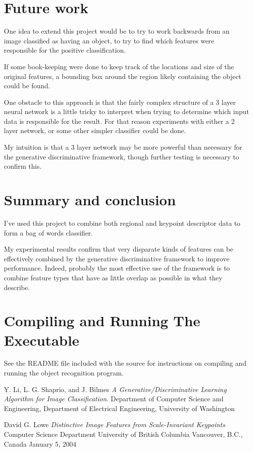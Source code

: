 \documentclass[11pt]{article}
\begin{document}
\section{Future work}

One idea to extend this project would be to try to work backwards from an
image classified as having an object, to try to find which features
were responsible for the positive classification.

If some book-keeping were done to keep track of the locations and size
of the original features, a bounding box around the region likely
containing the object could be found.

One obstacle to this approach is that the fairly complex structure of
a 3 layer neural network is a little tricky to interpret when trying
to determine which input data is responsible for the result. For
that reason experiments with either a 2 layer network, or some other
simpler classifier could be done.

My intuition is that a 3 layer network may be more powerful than
necessary for the generative discriminative framework, though further
testing is necessary to confirm this.

\section{Summary and conclusion}

I've used this project to combine both regional and keypoint
descriptor data to form a bag of words classifier.

My experimental results confirm that very disparate kinds of features
can be effectively combined by the generative discriminative framework
to improve performance. Indeed, probably the most effective use of the
framework is to combine feature types that have as little overlap as
possible in what they describe.

\section{Compiling and Running The Executable}

See the README file included with the source for instructions on
compiling and running the object recognition program.

\begin{thebibliography}{9}

  Y. Li, L. G. Shaprio, and J. Bilmes
  \emph{A Generative/Discriminative Learning Algorithm for Image Classification}.
  Department of Computer Science and Engineering,
  Department of Electrical Engineering,
  University of Washington

  David G. Lowe
  \emph{Distinctive Image Features from Scale-Invariant Keypoints}
  Computer Science Department
  University of British Columbia
  Vancouver, B.C., Canada
  January 5, 2004

\end{thebibliography}
\end{document}

